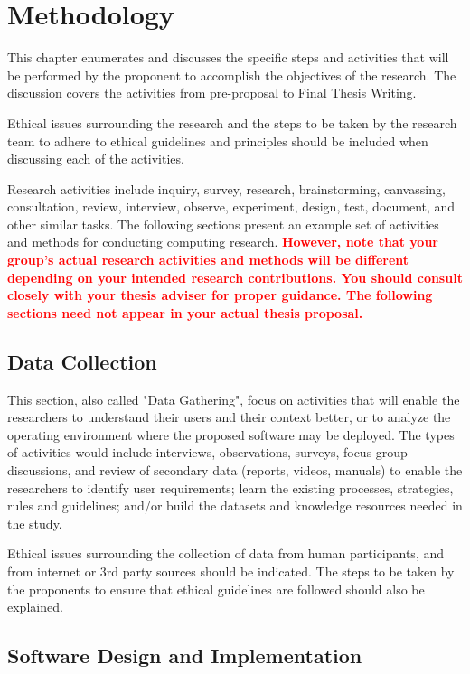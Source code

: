 \chapter{Methodology}
\label{sec:methodology}

This chapter enumerates and discusses the specific steps and activities that will be performed by the proponent to accomplish the objectives of the research. The discussion covers the activities from pre-proposal to Final Thesis Writing. 

Ethical issues surrounding the research and the steps to be taken by the research team to adhere to ethical guidelines and principles should be included when discussing each of the activities.

Research activities include inquiry, survey, research, brainstorming, canvassing, consultation, review, interview, observe, experiment, design, test, document, and other similar tasks. The following sections present an example set of activities and methods for conducting computing research. \textbf{\textcolor{red}{However, note that your group's actual research activities and methods will be different depending on your intended research contributions. You should consult closely with your thesis adviser for proper guidance. The following sections need not appear in your actual thesis proposal.}}

\section{Data Collection}

This section, also called "Data Gathering", focus on activities that will enable the researchers to understand their users and their context better, or to analyze the operating environment where the proposed software may be deployed. The types of activities would include interviews, observations, surveys, focus group discussions, and review of secondary data (reports, videos, manuals) to enable the researchers to identify user requirements; learn the existing processes, strategies, rules and guidelines; and/or build the datasets and knowledge resources needed in the study.

Ethical issues surrounding the collection of data from human participants, and from internet or 3rd party sources should be indicated. The steps to be taken by the proponents to ensure that ethical guidelines are followed should also be explained.

\section{Software Design and Implementation}

